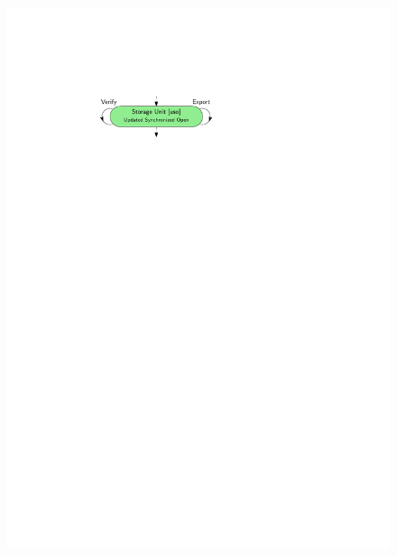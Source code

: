 \documentclass{beamer}
\begin{document}
\begin{frame}[fragile]
\begin{columns}
\begin{figure}
			\includegraphics[width=\textwidth]{figures/uso.pdf}
			\bigskip
		\end{figure}
	\end{columns}
\end{frame}
\end{document}
